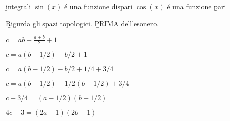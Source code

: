 \begin{multicols}{2}


\end{multicols}
\begin{multicols}{2} 

\b{integrali}
$\sin(x)$ \'{e} una funzione \b{dispari}
$\cos(x)$ \'{e} una funzione \b{pari}
\smallbreak
\end{multicols}

\Huge{ 
\b{Rigurda gli spazi topologici.}
\b{PRIMA dell'esonero.}

$c = ab - \frac{a + b}{2} + 1$

$c = a(b - 1/2) - b/2 + 1$

$c = a(b - 1/2) - b/2 + 1/4 + 3/4$

$c = a(b - 1/2) - 1/2(b - 1/2) + 3/4$

$c - 3/4 = (a - 1/2) (b - 1/2)$

$4c - 3 = (2a - 1) (2b - 1)$
}




